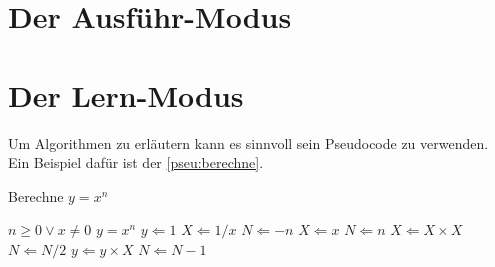 \section{Der Ausführ-Modus}

\section{Der Lern-Modus}
Um Algorithmen zu erläutern kann es sinnvoll sein Pseudocode zu verwenden. Ein Beispiel dafür ist der \autoref{pseu:berechne}. 
\begin{pseudocode} 
\caption{Berechne $y = x^n$}
\label{pseu:berechne}
\begin{algorithmic}[1]
    \Require $n \geq 0 \vee x \neq 0$
    \Ensure $y = x^n$
    \State $y \Leftarrow 1$
        \State $X \Leftarrow 1 / x$
        \State $N \Leftarrow -n$
    \Else
        \State $X \Leftarrow x$
        \State $N \Leftarrow n$
    \EndIf
            \State $X \Leftarrow X \times X$
            \State $N \Leftarrow N / 2$
        \Else
            \State $y \Leftarrow y \times X$
            \State $N \Leftarrow N - 1$
        \EndIf
    \EndWhile
\end{algorithmic}
\end{pseudocode}